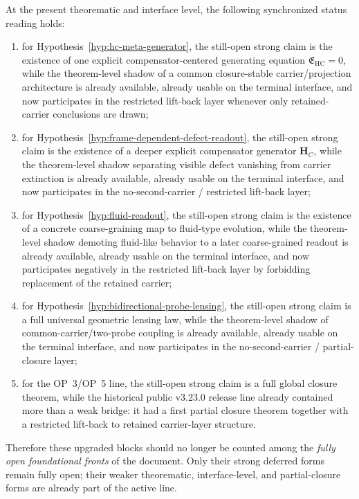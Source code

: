 \begin{proposition}
\label{prop:v322-hypothesis-open-question-status-synchronization-principle}
At the present theorematic and interface level, the following synchronized status reading holds:
\begin{enumerate}[leftmargin=2em,label=(\roman*)]
  \item for Hypothesis~\ref{hyp:hc-meta-generator}, the still-open strong claim is the existence of one explicit compensator-centered generating equation $\mathfrak E_{\mathrm{HC}}=0$, while the theorem-level shadow of a common closure-stable carrier/projection architecture is already available, already usable on the terminal interface, and now participates in the restricted lift-back layer whenever only retained-carrier conclusions are drawn;
  \item for Hypothesis~\ref{hyp:frame-dependent-defect-readout}, the still-open strong claim is the existence of a deeper explicit compensator generator $\mathbf H_C$, while the theorem-level shadow separating visible defect vanishing from carrier extinction is already available, already usable on the terminal interface, and now participates in the no-second-carrier / restricted lift-back layer;
  \item for Hypothesis~\ref{hyp:fluid-readout}, the still-open strong claim is the existence of a concrete coarse-graining map to fluid-type evolution, while the theorem-level shadow demoting fluid-like behavior to a later coarse-grained readout is already available, already usable on the terminal interface, and now participates negatively in the restricted lift-back layer by forbidding replacement of the retained carrier;
  \item for Hypothesis~\ref{hyp:bidirectional-probe-lensing}, the still-open strong claim is a full universal geometric lensing law, while the theorem-level shadow of common-carrier/two-probe coupling is already available, already usable on the terminal interface, and now participates in the no-second-carrier / partial-closure layer;
  \item for the OP~3/OP~5 line, the still-open strong claim is a full global closure theorem, while the historical public v3.23.0 release line already contained more than a weak bridge: it had a first partial closure theorem together with a restricted lift-back to retained carrier-layer structure.
\end{enumerate}
Therefore these upgraded blocks should no longer be counted among the \emph{fully open foundational fronts} of the document. Only their strong deferred forms remain fully open; their weaker theorematic, interface-level, and partial-closure forms are already part of the active line.
\end{proposition}

